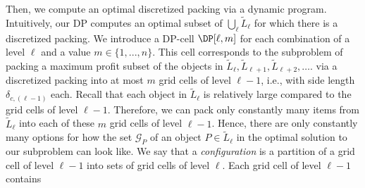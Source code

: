 \documentclass[10pt,a4paper]{article}
\theoremstyle{plain}
\theoremstyle{plain}
\theoremstyle{plain}
\theoremstyle{definition}
\begin{document}
Then, we compute an optimal
discretized packing via a dynamic program. Intuitively, our DP computes
an optimal subset of $\bigcup_{\ell}\tilde{L}_{\ell}$ for which there is a discretized
packing. %
We introduce a DP-cell %
$\DP[\ell,m]$ for each combination of a level $\ell$ and a value
$m\in\{1,...,n\}$. This cell corresponds to the subproblem of packing
a maximum profit subset of the objects in $\tilde{L}_{\ell},\tilde{L}_{\ell+1},\tilde{L}_{\ell+2},\dots.$
via a discretized packing into at most $m$ grid cells of level $\ell-1$,
i.e., with side length $\delta_{c,(\ell-1)}$ each. Recall that each
object in $\tilde{L}_{\ell}$ is relatively large compared to the grid cells
of level $\ell-1$. Therefore, we can pack only constantly many items
from $\tilde{L}_{\ell}$ into each of these $m$ grid cells of level $\ell-1$.
Hence, there are only constantly many options for how the set $\mathcal{G}_{P}$
of an object $P\in \tilde{L}_{\ell}$ in the optimal solution to our subproblem
can look like. We say that a \emph{configuration} is a
partition of a grid cell of level $\ell-1$ into sets of grid cells of level $\ell$.
Each grid cell of level $\ell-1$ contains
\end{document}
